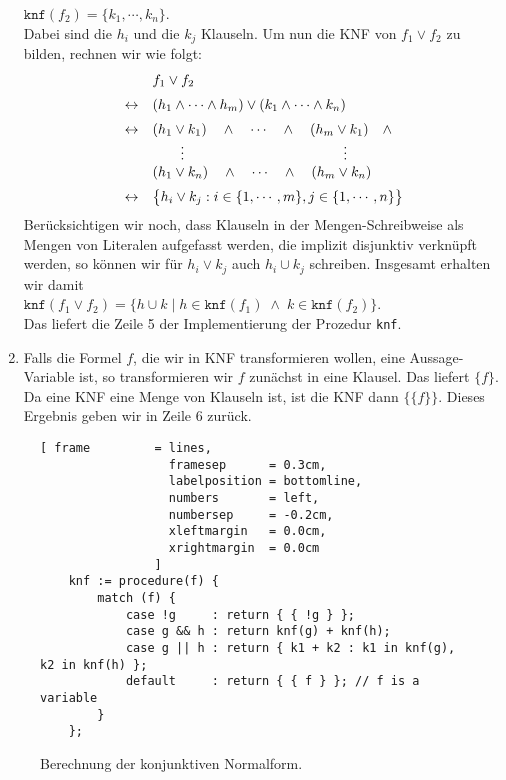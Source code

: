 \begin{enumerate}
      $\texttt{knf}(f_2) = \{ k_1, \cdots, k_n \}$. \\[0.2cm]
      Dabei sind die $h_i$ und die $k_j$ Klauseln.  Um nun die KNF von $f_1 \vee f_2$ zu
      bilden, rechnen wir wie folgt: 
      $$
      \begin{array}[c]{ll}
        & f_1 \vee f_2  \\[0.2cm]
      \leftrightarrow & (h_1 \wedge \cdots \wedge h_m) \vee (k_1 \wedge \cdots \wedge k_n) \\[0.2cm]
      \leftrightarrow & (h_1 \vee k_1) \quad \wedge \quad \cdots \quad \wedge \quad (h_m \vee k_1) \quad \wedge \\ 
                      & \qquad \vdots     \hspace*{4cm} \vdots                \\
                      & (h_1 \vee k_n) \quad \wedge \quad \cdots \quad \wedge \quad (h_m \vee k_n) \\[0.2cm] 
      \leftrightarrow & \bigl\{ h_i \vee k_j : i \in \{ 1, \cdots, m\}, j \in \{ 1, \cdots, n \} \bigr\} \\ 
      \end{array}
      $$
      Ber\"{u}cksichtigen wir noch, dass Klauseln in der Mengen-Schreibweise als Mengen von
      Literalen aufgefasst werden, die implizit disjunktiv verkn\"{u}pft werden, so k\"{o}nnen wir
      f\"{u}r $h_i \vee k_j$ auch $h_i \cup k_j$ schreiben.  
      Insgesamt erhalten wir damit \\[0.2cm]
      \hspace*{1.3cm} 
      $\texttt{knf}(f_1 \vee f_2) = \bigl\{ h \cup k \mid h \in \texttt{knf}(f_1) \;\wedge\; k \in \texttt{knf}(f_2) \bigr\}$.
      \\[0.2cm]
      Das liefert die Zeile 5 der Implementierung der Prozedur \texttt{knf}.
\item Falls die Formel $f$, die wir in KNF transformieren wollen, eine Aussage-Variable
      ist, so transformieren wir $f$ zun\"{a}chst in eine Klausel. Das liefert $\{f\}$.  
      Da eine KNF eine Menge von Klauseln ist, ist die KNF dann $\bigl\{\{f\}\bigr\}$.
      Dieses Ergebnis geben wir in Zeile 6 zur\"{u}ck.
\end{enumerate}

\begin{figure}[!ht]
  \centering
\begin{Verbatim}[ frame         = lines, 
                  framesep      = 0.3cm, 
                  labelposition = bottomline,
                  numbers       = left,
                  numbersep     = -0.2cm,
                  xleftmargin   = 0.0cm,
                  xrightmargin  = 0.0cm
                ]
    knf := procedure(f) {
        match (f) {
            case !g     : return { { !g } };
            case g && h : return knf(g) + knf(h);
            case g || h : return { k1 + k2 : k1 in knf(g), k2 in knf(h) };
            default     : return { { f } }; // f is a variable
        }
    };
\end{Verbatim}
\vspace*{-0.3cm}
  \caption{Berechnung der konjunktiven Normalform.}
  \label{fig:knf}
\end{figure}

